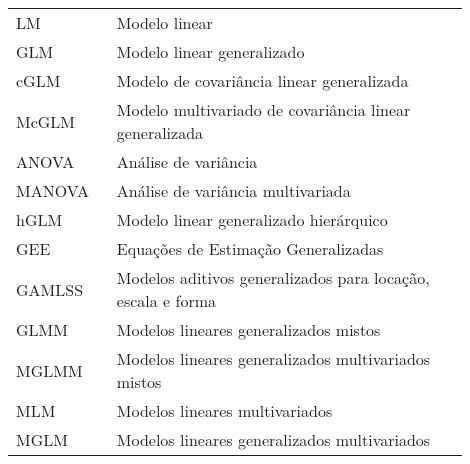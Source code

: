 

\begin{listaacron}

\begin{longtable}[l]{p{0.2\linewidth}p{0.7\linewidth}}

LM & Modelo linear\\
GLM & Modelo linear generalizado\\
cGLM & Modelo de covariância linear generalizada\\
McGLM & Modelo multivariado de covariância linear generalizada\\
ANOVA & Análise de variância\\
MANOVA & Análise de variância multivariada\\
hGLM & Modelo linear generalizado hierárquico\\
GEE & Equações de Estimação Generalizadas\\
GAMLSS & Modelos aditivos generalizados para locação, escala e forma\\
GLMM & Modelos lineares generalizados mistos\\
MGLMM & Modelos lineares generalizados multivariados mistos\\
MLM & Modelos lineares multivariados\\
MGLM & Modelos lineares generalizados multivariados\\


\end{longtable}

\end{listaacron}

